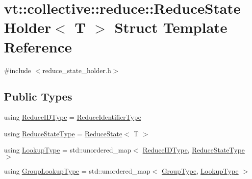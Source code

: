\hypertarget{structvt_1_1collective_1_1reduce_1_1_reduce_state_holder}{}\section{vt\+:\+:collective\+:\+:reduce\+:\+:Reduce\+State\+Holder$<$ T $>$ Struct Template Reference}
\label{structvt_1_1collective_1_1reduce_1_1_reduce_state_holder}


{\ttfamily \#include $<$reduce\+\_\+state\+\_\+holder.\+h$>$}

\subsection*{Public Types}
\begin{DoxyCompactItemize}
\item 
using \hyperlink{structvt_1_1collective_1_1reduce_1_1_reduce_state_holder_a783eeed6422fcc71cea89deca5ed8f08}{Reduce\+I\+D\+Type} = \hyperlink{namespacevt_1_1collective_1_1reduce_ad688d164ad18b2011198cbc97cc84b74}{Reduce\+Identifier\+Type}
\item 
using \hyperlink{structvt_1_1collective_1_1reduce_1_1_reduce_state_holder_a6333d237936c835115b19a7421edf6ec}{Reduce\+State\+Type} = \hyperlink{structvt_1_1collective_1_1reduce_1_1_reduce_state}{Reduce\+State}$<$ T $>$
\item 
using \hyperlink{structvt_1_1collective_1_1reduce_1_1_reduce_state_holder_ab3383c5963e7187cf360f6c483d3c5cb}{Lookup\+Type} = std\+::unordered\+\_\+map$<$ \hyperlink{structvt_1_1collective_1_1reduce_1_1_reduce_state_holder_a783eeed6422fcc71cea89deca5ed8f08}{Reduce\+I\+D\+Type}, \hyperlink{structvt_1_1collective_1_1reduce_1_1_reduce_state_holder_a6333d237936c835115b19a7421edf6ec}{Reduce\+State\+Type} $>$
\item 
using \hyperlink{structvt_1_1collective_1_1reduce_1_1_reduce_state_holder_a945472a204b8db45e2fdb7f49b7b020a}{Group\+Lookup\+Type} = std\+::unordered\+\_\+map$<$ \hyperlink{namespacevt_a27b5e4411c9b6140c49100e050e2f743}{Group\+Type}, \hyperlink{structvt_1_1collective_1_1reduce_1_1_reduce_state_holder_ab3383c5963e7187cf360f6c483d3c5cb}{Lookup\+Type} $>$
\end{DoxyCompactItemize}
